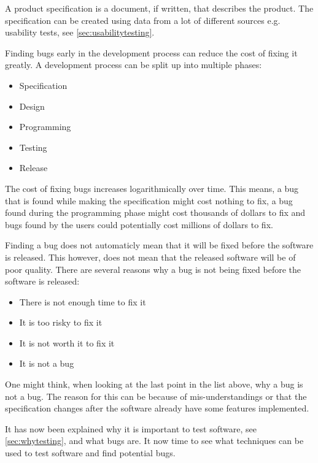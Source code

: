 A product specification is a document, if written, that describes the product.
The specification can be created using data from a lot of different sources e.g. usability tests, see \cref{sec:usabilitytesting}. \cite{SoftwareTesting}

Finding bugs early in the development process can reduce the cost of fixing it greatly.
A development process can be split up into multiple phases:

\begin{itemize}
	\item Specification
	\item Design
	\item Programming
	\item Testing
	\item Release
\end{itemize}

The cost of fixing bugs increases logarithmically over time.
This means, a bug that is found while making the specification might cost nothing to fix, a bug found during the programming phase might cost thousands of dollars to fix and bugs found by the users could potentially cost millions of dollars to fix. \cite{SoftwareTesting}


Finding a bug does not automaticly mean that it will be fixed before the software is released.
This however, does not mean that the released software will be of poor quality.
There are several reasons why a bug is not being fixed before the software is released: \cite{SoftwareTesting}

\begin{itemize}
	\item There is not enough time to fix it
	\item It is too risky to fix it
	\item It is not worth it to fix it
	\item It is not a bug
\end{itemize}

One might think, when looking at the last point in the list above, why a bug is not a bug.
The reason for this can be because of mis-understandings or that the specification changes after the software already have some features implemented. \cite{SoftwareTesting}

It has now been explained why it is important to test software, see \cref{sec:whytesting}, and what bugs are.
It now time to see what techniques can be used to test software and find potential bugs.

